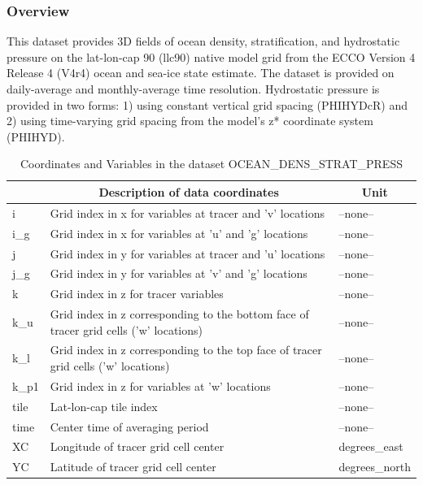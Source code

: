 \subsubsection{Overview}
This dataset provides 3D fields of ocean density, stratification, and hydrostatic pressure on the lat-lon-cap 90 (llc90) native model grid from the ECCO Version 4 Release 4 (V4r4) ocean and sea-ice state estimate. The dataset is provided on daily-average and monthly-average time resolution. Hydrostatic pressure is provided in two forms: 1) using constant vertical grid spacing (PHIHYDcR) and 2) using time-varying grid spacing from the model's z* coordinate system (PHIHYD). 
\begin{longtable}{|m{}|m{}|m{}|}
\caption{Coordinates and Variables in the dataset OCEAN\_DENS\_STRAT\_PRESS}
\label{tab:table-OCEAN_DENS_STRAT_PRESS-fields} \\ 
\hline \endhead \hline \endfoot
\rowcolor{lightgray} \multicolumn{1}{|c|}{\textbf{Coordinates}} & \multicolumn{1}{|c|}{\textbf{Description of data coordinates}} &  \multicolumn{1}{|c|}{\textbf{Unit}}\\ \hline
i &Grid index in x for variables at tracer and 'v' locations &--none--  \\ \hline
i\_g &Grid index in x for variables at 'u' and 'g' locations &--none--  \\ \hline
j &Grid index in y for variables at tracer and 'u' locations &--none--  \\ \hline
j\_g &Grid index in y for variables at 'v' and 'g' locations &--none--  \\ \hline
k &Grid index in z for tracer variables &--none--  \\ \hline
k\_u &Grid index in z corresponding to the bottom face of tracer grid cells ('w' locations) &--none--  \\ \hline
k\_l &Grid index in z corresponding to the top face of tracer grid cells ('w' locations) &--none--  \\ \hline
k\_p1 &Grid index in z for variables at 'w' locations &--none--  \\ \hline
tile &Lat-lon-cap tile index &--none--  \\ \hline
time &Center time of averaging period &--none--  \\ \hline
XC &Longitude of tracer grid cell center &degrees\_east  \\ \hline
YC &Latitude of tracer grid cell center &degrees\_north  \\ \hline

\end{longtable}

